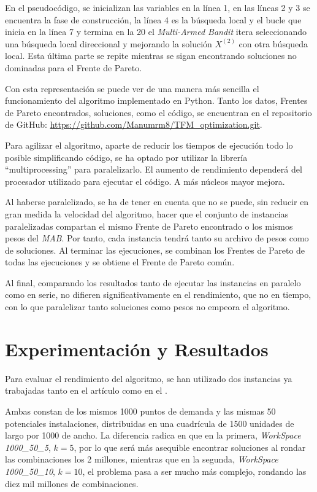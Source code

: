 \documentclass[12pt,a4paper]{book}
\begin{document}
En el pseudocódigo, se inicializan las variables en la línea 1, en las líneas 2 y 3 se encuentra la fase de construcción, la línea 4
es la búsqueda local y el bucle que inicia en la línea 7 y termina en la 20 el \textit{Multi-Armed Bandit} itera seleccionando una búsqueda local direccional
y mejorando la solución $X^{(2)}$ con otra búsqueda local. Esta última parte se repite mientras se sigan encontrando soluciones no dominadas para el Frente de Pareto.


Con esta representación se puede ver de una manera más sencilla el funcionamiento del algoritmo implementado en Python. Tanto los datos, Frentes de Pareto encontrados, soluciones, como el código, se encuentran en el repositorio de GitHub: \url{https://github.com/Manumrm8/TFM_optimization.git}.

Para agilizar el algoritmo, aparte de reducir los tiempos de ejecución todo lo posible simplificando código, se ha optado por utilizar la librería ``multiprocessing'' para paralelizarlo.
El aumento de rendimiento dependerá del procesador utilizado para ejecutar el código. A más núcleos mayor mejora.

Al haberse paralelizado, se ha de tener en cuenta que no se puede, sin reducir en gran medida la velocidad del algoritmo, hacer que el conjunto de instancias paralelizadas compartan
el mismo Frente de Pareto encontrado o los mismos pesos del \textit{MAB}. Por tanto, cada instancia tendrá tanto su archivo de pesos como de soluciones. Al terminar las ejecuciones, se combinan los Frentes de Pareto de 
todas las ejecuciones y se obtiene el Frente de Pareto común.

Al final, comparando los resultados tanto de ejecutar las instancias en paralelo como en serie, no difieren significativamente en el rendimiento, que no en tiempo, con lo que paralelizar tanto soluciones como pesos no empeora 
el algoritmo.

\chapter{Experimentación y Resultados}

Para evaluar el rendimiento del algoritmo, se han utilizado dos instancias ya trabajadas tanto en el artículo \cite{k-balanced_1} como en el \cite{k-Balanced_2}. 

Ambas constan de los mismos 1000 puntos de demanda y las mismas 50 potenciales instalaciones, distribuidas en una cuadrícula de 1500 unidades de largo por 1000 de ancho.
La diferencia radica en que en la primera, \textit{WorkSpace 1000\_50\_5}, $k=5$, por lo que será más asequible encontrar soluciones al rondar las combinaciones los 2 millones, mientras que en la segunda, \textit{WorkSpace 1000\_50\_10}, $k=10$, el problema pasa a ser mucho más complejo, rondando las diez mil millones de combinaciones.
\end{document}
